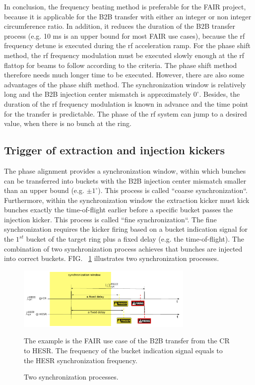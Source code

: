 In conclusion, the frequency beating method is preferable for the FAIR project, because it is applicable for the B2B transfer with either an integer or non integer circumference ratio. In addition, it reduces the duration of the B2B transfer process (e.g. 10 ms is an upper bound for most FAIR use cases), because the rf frequency detune is executed during the rf acceleration ramp. For the phase shift method, the rf frequency modulation must be executed slowly enough at the rf flattop for beams to follow according to the criteria. The phase shift method therefore needs much longer time to be executed. However, there are also some advantages of the phase shift method. The synchronization window is relatively long and the B2B injection center mismatch is approximately $0^\circ$. Besides, the duration of the rf frequency modulation is known in advance and the time point for the transfer is predictable. The phase of the rf system can jump to a desired value, when there is no bunch at the ring.  
\subsection{Trigger of extraction and injection kickers}
The phase alignment provides a synchronization window, within which bunches can be transferred into buckets with the B2B injection center mismatch smaller than an upper bound (e.g. $\pm1^\circ$). This process is called ``coarse synchronization``. Furthermore, within the synchronization window the extraction kicker must kick bunches exactly the time-of-flight earlier before a specific bucket passes the injection kicker. This process is called ``fine synchronization``. The fine synchronization requires the kicker firing based on a bucket indication signal for the $1^\mathit{st}$ bucket of the target ring plus a fixed delay (e.g. the time-of-flight). The combination of two synchronization process achieves that bunches are injected into correct buckets. FIG. ~\ref{ext_inj_kicker1} illustrates two synchronization processes.
\begin{figure}[!htb]
   \centering   
   \includegraphics*[width=85mm]{ext_inj_ill2.pdf}
   \caption{Two synchronization processes.}
{\small{The example is the FAIR use case of the B2B transfer from the CR to HESR. The frequency of the bucket indication signal equals to the HESR synchronization frequency.}}
   \label{ext_inj_kicker1}
\end{figure}


